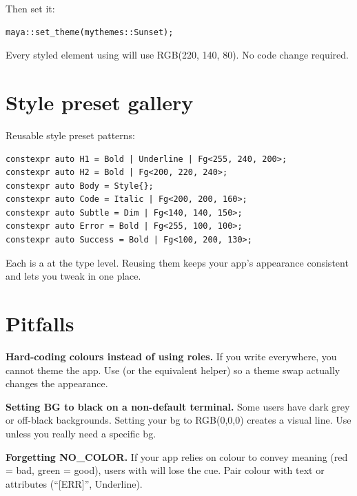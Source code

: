 Then set it:

\begin{lstlisting}
maya::set_theme(mythemes::Sunset);
\end{lstlisting}

Every styled element using  will use
RGB(220, 140, 80). No code change required.

\section{Style preset gallery}

Reusable style preset patterns:

\begin{lstlisting}
constexpr auto H1 = Bold | Underline | Fg<255, 240, 200>;
constexpr auto H2 = Bold | Fg<200, 220, 240>;
constexpr auto Body = Style{};
constexpr auto Code = Italic | Fg<200, 200, 160>;
constexpr auto Subtle = Dim | Fg<140, 140, 150>;
constexpr auto Error = Bold | Fg<255, 100, 100>;
constexpr auto Success = Bold | Fg<100, 200, 130>;
\end{lstlisting}

Each is a  at the type level. Reusing them keeps
your app's appearance consistent and lets you tweak in one
place.

\section{Pitfalls}

\begin{warning}
\textbf{Hard-coding colours instead of using roles.} If you write
 everywhere, you cannot theme the app.
Use  (or the equivalent helper) so a theme
swap actually changes the appearance.
\end{warning}

\begin{warning}
\textbf{Setting BG to black on a non-default terminal.} Some
users have dark grey or off-black backgrounds. Setting your bg
to RGB(0,0,0) creates a visual line. Use 
unless you really need a specific bg.
\end{warning}

\begin{warning}
\textbf{Forgetting NO\_COLOR.} If your app relies on colour to
convey meaning (red = bad, green = good), users with
 will lose the cue. Pair colour with text
or attributes (``[ERR]'', Underline).
\end{warning}

